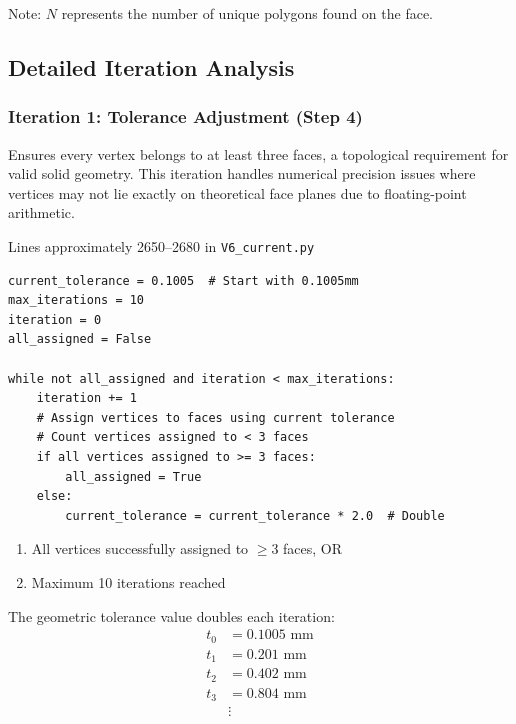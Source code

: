 Note: $N$ represents the number of unique polygons found on the face.

\subsection{Detailed Iteration Analysis}

\subsubsection{Iteration 1: Tolerance Adjustment (Step 4)}

Ensures every vertex belongs to at least three faces, a topological requirement for valid solid geometry. This iteration handles numerical precision issues where vertices may not lie exactly on theoretical face planes due to floating-point arithmetic.

Lines approximately 2650--2680 in \texttt{V6\_current.py}

\begin{lstlisting}
current_tolerance = 0.1005  # Start with 0.1005mm
max_iterations = 10
iteration = 0
all_assigned = False

while not all_assigned and iteration < max_iterations:
    iteration += 1
    # Assign vertices to faces using current tolerance
    # Count vertices assigned to < 3 faces
    if all vertices assigned to >= 3 faces:
        all_assigned = True
    else:
        current_tolerance = current_tolerance * 2.0  # Double
\end{lstlisting}

\begin{enumerate}
    \item All vertices successfully assigned to $\geq 3$ faces, OR
    \item Maximum 10 iterations reached
\end{enumerate}

The geometric tolerance value doubles each iteration:
\begin{align*}
t_0 &= 0.1005 \text{ mm} \\
t_1 &= 0.201 \text{ mm} \\
t_2 &= 0.402 \text{ mm} \\
t_3 &= 0.804 \text{ mm} \\
&\vdots
\end{align*}

